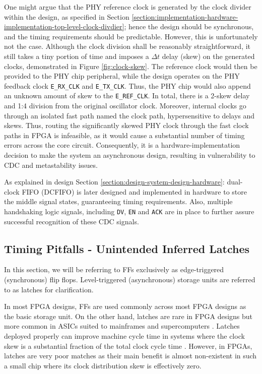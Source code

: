 \documentclass[a4paper]{report}
\newcommand{\code}{\texttt}
\begin{document}
One might argue that the PHY reference clock is generated by the clock divider within the design, as specified in Section \ref{section:implementation-hardware-implementation-top-level-clock-divdier}; hence the design should be synchronous, and the timing requirements should be predictable. However, this is unfortunately not the case. Although the clock division shall be reasonably straightforward, it still takes a tiny portion of time and imposes a $\Delta t$ delay (skew) on the generated clocks, demonstrated in Figure \ref{fig:clock-skew}. The reference clock would then be provided to the PHY chip peripheral, while the design operates on the PHY feedback clock \code{E\_RX\_CLK} and \code{E\_TX\_CLK}. Thus, the PHY chip would also append an unknown amount of skew to the \code{E\_REF\_CLK}. In total, there is a 2-skew delay and 1:4 division from the original oscillator clock. Moreover, internal clocks go through an isolated fast path named the clock path, hypersensitive to delays and skews. Thus, routing the significantly skewed PHY clock through the fast clock paths in FPGA is infeasible, as it would cause a substantial number of timing errors across the core circuit. Consequently, it is a hardware-implementation decision to make the system an asynchronous design, resulting in vulnerability to CDC and metastability issues.
 
As explained in design Section \ref{section:design-system-design-hardware}: dual-clock FIFO (DCFIFO) is later designed and implemented in hardware to store the middle signal states, guaranteeing timing requirements. Also, multiple handshaking logic signals, including \code{DV}, \code{EN} and \code{ACK} are in place to further assure successful recognition of these CDC signals.

\subsection{Timing Pitfalls - Unintended Inferred Latches}

In this section, we will be referring to FFs exclusively as edge-triggered (synchronous) flip flops. Level-triggered (asynchronous) storage units are referred to as latches for clarification.

In most FPGA designs, FFs are used commonly across most FPGA designs as the basic storage unit. On the other hand, latches are rare in FPGA designs but more common in ASICs suited to mainframes and supercomputers \cite{vasumathi-2018}. Latches deployed properly can improve machine cycle time in systems where the clock skew is a substantial fraction of the total clock cycle time \cite{vasumathi-2018}. However, in FPGAs, latches are very poor matches as their main benefit is almost non-existent in such a small chip where its clock distribution skew is effectively zero.
\end{document}
